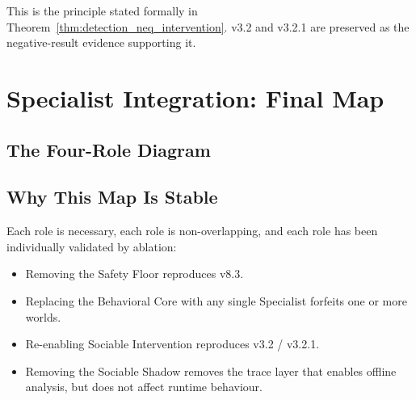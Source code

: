 This is the principle stated formally in
Theorem~\ref{thm:detection_neq_intervention}. v3.2 and v3.2.1 are
preserved as the negative-result evidence supporting it.

\chapter{Specialist Integration: Final Map}
\label{ch:specialist_integration_final}

\section{The Four-Role Diagram}

\begin{center}
\end{center}

\section{Why This Map Is Stable}

Each role is necessary, each role is non-overlapping, and each role
has been individually validated by ablation:

\begin{itemize}
  \item Removing the Safety Floor reproduces v8.3.
  \item Replacing the Behavioral Core with any single Specialist
    forfeits one or more worlds.
  \item Re-enabling Sociable Intervention reproduces v3.2 / v3.2.1.
  \item Removing the Sociable Shadow removes the trace layer that
    enables offline analysis, but does not affect runtime behaviour.
\end{itemize}

